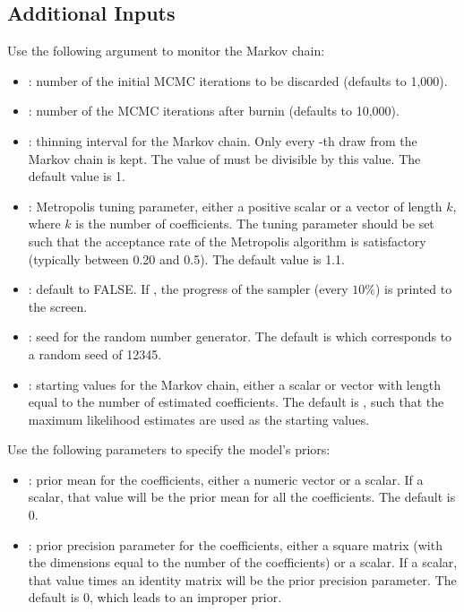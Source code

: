 \documentclass[letterpaper,10pt,english]{sphinxmanual}
\begin{document}
\subsection{Additional Inputs}
\label{vignette:id100}
Use the following argument to monitor the Markov chain:
\begin{itemize}
\item {} 
: number of the initial MCMC iterations to be discarded
(defaults to 1,000).

\item {} 
: number of the MCMC iterations after burnin (defaults to
10,000).

\item {} 
: thinning interval for the Markov chain. Only every
-th draw from the Markov chain is kept. The value of 
must be divisible by this value. The default value is 1.

\item {} 
: Metropolis tuning parameter, either a positive scalar or a
vector of length \(k\), where \(k\) is the number of
coefficients. The tuning parameter should be set such that the
acceptance rate of the Metropolis algorithm is satisfactory
(typically between 0.20 and 0.5). The default value is 1.1.

\item {} 
: default to FALSE. If , the progress of the
sampler (every \(10\%\)) is printed to the screen.

\item {} 
: seed for the random number generator. The default is 
which corresponds to a random seed of 12345.

\item {} 
: starting values for the Markov chain, either a scalar
or vector with length equal to the number of estimated coefficients.
The default is , such that the maximum likelihood estimates are
used as the starting values.

\end{itemize}

Use the following parameters to specify the model’s priors:
\begin{itemize}
\item {} 
: prior mean for the coefficients, either a numeric vector or a
scalar. If a scalar, that value will be the prior mean for all the
coefficients. The default is 0.

\item {} 
: prior precision parameter for the coefficients, either a
square matrix (with the dimensions equal to the number of the
coefficients) or a scalar. If a scalar, that value times an identity
matrix will be the prior precision parameter. The default is 0, which
leads to an improper prior.

\end{itemize}
\end{document}
